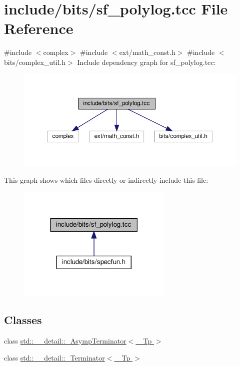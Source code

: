 \hypertarget{sf__polylog_8tcc}{}\section{include/bits/sf\+\_\+polylog.tcc File Reference}
\label{sf__polylog_8tcc}
{\ttfamily \#include $<$complex$>$}\newline
{\ttfamily \#include $<$ext/math\+\_\+const.\+h$>$}\newline
{\ttfamily \#include $<$bits/complex\+\_\+util.\+h$>$}\newline
Include dependency graph for sf\+\_\+polylog.\+tcc\+:
\nopagebreak
\begin{figure}[H]
\begin{center}
\leavevmode
\includegraphics[width=350pt]{sf__polylog_8tcc__incl}
\end{center}
\end{figure}
This graph shows which files directly or indirectly include this file\+:
\nopagebreak
\begin{figure}[H]
\begin{center}
\leavevmode
\includegraphics[width=210pt]{sf__polylog_8tcc__dep__incl}
\end{center}
\end{figure}
\subsection*{Classes}
\begin{DoxyCompactItemize}
\item 
class \hyperlink{classstd_1_1____detail_1_1__AsympTerminator}{std\+::\+\_\+\+\_\+detail\+::\+\_\+\+Asymp\+Terminator$<$ \+\_\+\+Tp $>$}
\item 
class \hyperlink{classstd_1_1____detail_1_1__Terminator}{std\+::\+\_\+\+\_\+detail\+::\+\_\+\+Terminator$<$ \+\_\+\+Tp $>$}
\end{DoxyCompactItemize}
